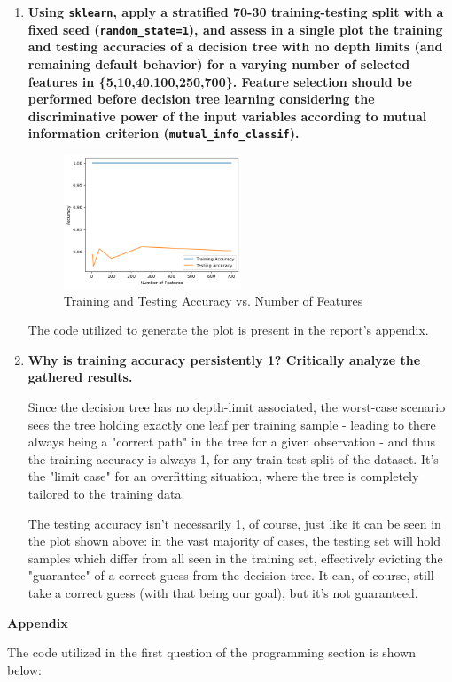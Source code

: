 \documentclass[12pt]{article}
\begin{document}
\begin{enumerate}[leftmargin=\labelsep,resume]
  \item \textbf{Using \texttt{sklearn}, apply a stratified 70-30 training-testing split with a fixed seed (\texttt{random\_state=1}), and assess in a single plot the training and testing accuracies of a decision tree with no depth limits (and remaining default behavior) for a varying number of selected features in \{5,10,40,100,250,700\}. Feature selection should be performed before decision tree learning considering the discriminative power of the input variables according to mutual information criterion (\texttt{mutual\_info\_classif}).}

        \begin{figure}[htpb]
          \centering
          \includegraphics[width=0.5\textwidth]{../assets/hw1-2.1.png}
          \caption{Training and Testing Accuracy vs. Number of Features}
        \end{figure}

        The code utilized to generate the plot is present in the report's appendix.

  \item \textbf{Why is training accuracy persistently 1? Critically analyze the gathered results.}

        Since the decision tree has no depth-limit associated, the worst-case scenario sees the tree
        holding exactly one leaf per training sample - leading to there always being a "correct path" in the tree for a given observation - and thus the training accuracy is always 1, for any train-test split of the dataset.
        It's the "limit case" for an overfitting situation, where the tree is completely tailored to the training data.

        The testing accuracy isn't necessarily 1, of course, just like it can be seen in the plot shown above: in the vast majority of cases, the testing set will hold samples which differ from all seen in the training set, effectively evicting the "guarantee" of a correct guess from the decision tree. It can, of course, still take a correct guess (with that being our goal), but it's not guaranteed.

\end{enumerate}

\large{\textbf{Appendix}\vskip 0.3cm}

The code utilized in the first question of the programming section is shown below:


\end{document}
